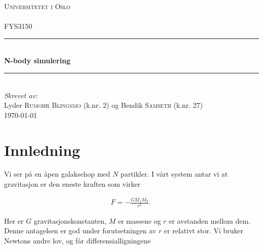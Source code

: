 \documentclass[11pt, twocolumn]{article}
\begin{document}
\begin{titlepage}
  \newcommand{\HRule}{\rule{\linewidth}{0.5mm}}
  \center
  \textsc{\LARGE Universitetet i Oslo}\\[1.5cm] %
  \textsc{\Large }\\[0.5cm] %
  \textsc{\large FYS3150}\\[0.5cm] %
  \HRule \\[0.4cm]
  { \huge \bfseries N-body simulering}\\[0.4cm]
  \HRule \\[1.5cm]
  \Large \emph{Skrevet av:}\\
  Lyder \textsc{Rumohr Blingsmo} (k.nr. 2) og Bendik \textsc{Samseth} (k.nr. 27)\\[3cm]
  {\large \today}\\[3cm]
  \vfill
\end{titlepage}

\section{Innledning}
Vi ser på en åpen galaksehop med $N$ partikler. I vårt system antar vi at 
gravitasjon er den eneste kraften som virker

\begin{align}
 F = -\frac{GM_1M_2}{r^2}.\
\end{align}

Her er $G$ gravitasjonskonstanten, $M$ er massene og $r$ er avstanden mellom dem. 
Denne antagelsen er god under forutsetningen av $r$ er relativt stor. Vi bruker
Newtons andre lov, og får differensialligningene 
\end{document}
